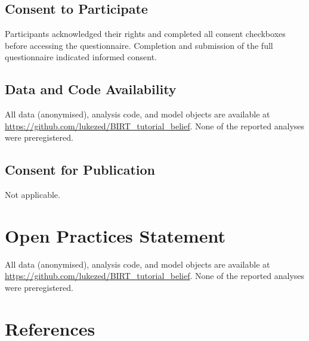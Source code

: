 \documentclass[
  man,
  floatsintext,
  longtable,
  nolmodern,
  notxfonts,
  notimes,
  colorlinks=true,linkcolor=blue,citecolor=blue,urlcolor=blue]{apa7}
\begin{document}
\subsection{Consent to Participate}\label{consent-to-participate}

Participants acknowledged their rights and completed all consent
checkboxes before accessing the questionnaire. Completion and submission
of the full questionnaire indicated informed consent.

\subsection{Data and Code
Availability}\label{data-and-code-availability}

All data (anonymised), analysis code, and model objects are available at
\url{https://github.com/lukezed/BIRT_tutorial_belief}. None of the
reported analyses were preregistered.

\subsection{Consent for Publication}\label{consent-for-publication}

Not applicable.

\section{Open Practices Statement}\label{open-practices-statement}

All data (anonymised), analysis code, and model objects are available at
\url{https://github.com/lukezed/BIRT_tutorial_belief}. None of the
reported analyses were preregistered.

\newpage

\section{References}\label{references}
\end{document}
